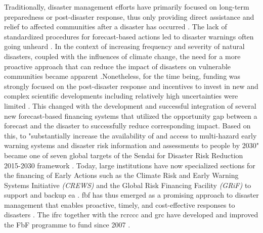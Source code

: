 Traditionally, disaster management efforts have primarily focused on long-term preparedness or post-disaster response, thus only providing direct assistance and relief to affected communities after a disaster has occurred \autocite{coughlandeperezForecastbasedFinancingApproach2015,unisdrHyogoFrameworkAction2005}. The lack of standardized procedures for forecast-based actions led to disaster warnings often going unheard \autocite{kolenImpactsStormXynthia2013}. In the context of increasing frequency and severity of natural disasters, coupled with the influences of climate change, the need for a more proactive approach that can reduce the impact of disasters on vulnerable communities became apparent \autocite{coughlandeperezForecastbasedFinancingApproach2015,trisosAfrica2022}.\newline Nonetheless, for the time being, funding was strongly focused on the post-disaster response and incentives to invest in new and complex scientific developments including relatively high uncertainties were limited \autocite{coughlandeperezActionbasedFloodForecasting2016}. This changed with the development and successful integration of several new forecast-based financing systems that utilized the opportunity gap between a forecast and the disaster to successfully reduce corresponding impact. Based on this, to "substantially increase the availability of and access to multi-hazard early warning systems and disaster risk information and assessments to people by 2030" became one of seven global targets of the Sendai for Disaster Risk Reduction 2015-2030 framework \autocites{coughlandeperezActionbasedFloodForecasting2016}[12]{undrrSendaiFrameworkDisaster2015}. Today, large institutions have now specialized sections for the financing of Early Actions such as the Climate Risk and Early Warning Systems Initiative \textit{(CREWS)} and the Global Risk Financing Facility \textit{(GRiF)} to support and backup \acrlong{ea} \autocite{crewsClimateRiskEarly,worldbankGlobalRiskFinancing}. \acrlong{fbf} has thus emerged as a promising approach to disaster management that enables proactive, timely, and cost-effective responses to disasters \autocite{coughlandeperezForecastbasedFinancingApproach2015,grcFORECASTBASEDFINANCINGInnovative2017}. The \acrfull{ifrc} together with the \acrfull{rcrccc} and \acrfull{grc} have developed and improved the FbF programme to fund  since 2007 \autocite{ifrcForecastbasedFinancingNew2019}. 

